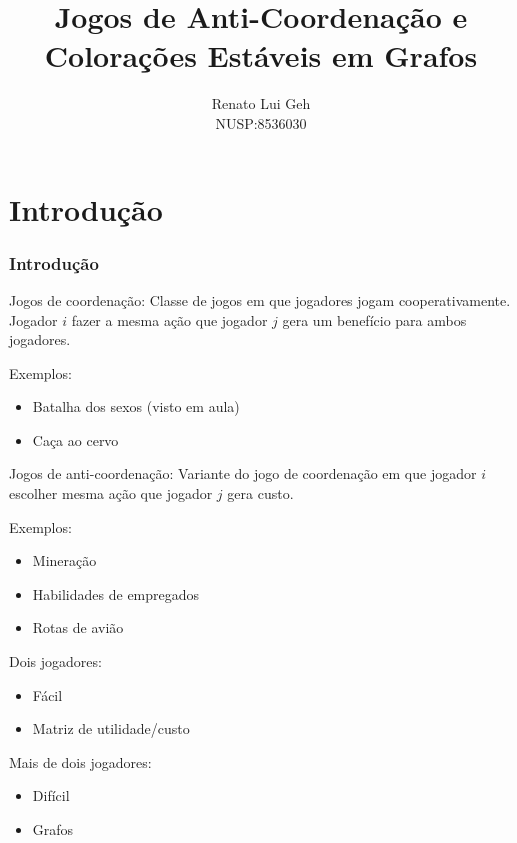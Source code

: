 \documentclass{beamer}
\title{Jogos de Anti-Coordenação e Colorações Estáveis em Grafos}
\author{Renato Lui Geh\\NUSP:8536030}
\date{}
\theoremstyle{plain}
\newcommand{\p}{\pause}
\begin{document}
\frame{\titlepage}

\section{Introdução}
\begin{frame}
  \frametitle{Introdução}

  \begin{block}{Jogos de coordenação:}
    Classe de jogos em que jogadores jogam cooperativamente. Jogador $i$ fazer a mesma ação que
    jogador $j$ gera um benefício para ambos jogadores.
  \end{block}\p

  \begin{block}{Exemplos:}
    \begin{itemize}
      \item Batalha dos sexos (visto em aula)\p
      \item Caça ao cervo
    \end{itemize}
  \end{block}
\end{frame}

\begin{frame}
  \begin{block}{Jogos de anti-coordenação:}
    Variante do jogo de coordenação em que jogador $i$ escolher mesma ação que jogador $j$ gera
    custo.
  \end{block}\p

  \begin{block}{Exemplos:}
    \begin{itemize}
      \item Mineração\p
      \item Habilidades de empregados\p
      \item Rotas de avião
    \end{itemize}
  \end{block}
\end{frame}

\begin{frame}
  \begin{block}{Dois jogadores:}
    \begin{itemize}
      \item Fácil
      \item Matriz de utilidade/custo
    \end{itemize}
  \end{block}\p

  \begin{block}{Mais de dois jogadores:}
    \begin{itemize}
      \item Difícil
      \item Grafos
    \end{itemize}
  \end{block}
\end{frame}
\end{document}
